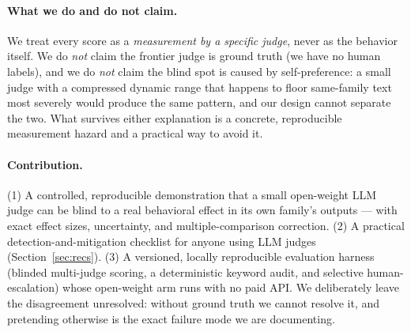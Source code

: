 \paragraph{What we do and do not claim.} We treat every score as a
\emph{measurement by a specific judge}, never as the behavior itself. We do
\emph{not} claim the frontier judge is ground truth (we have no human labels), and
we do \emph{not} claim the blind spot is caused by self-preference: a small judge
with a compressed dynamic range that happens to floor same-family text most
severely would produce the same pattern, and our design cannot separate the two.
What survives either explanation is a concrete, reproducible measurement hazard
and a practical way to avoid it.

\paragraph{Contribution.} (1) A controlled, reproducible demonstration that a
small open-weight LLM judge can be blind to a real behavioral effect in its own
family's outputs --- with exact effect sizes, uncertainty, and
multiple-comparison correction. (2) A practical detection-and-mitigation
checklist for anyone using LLM judges (Section~\ref{sec:recs}). (3) A versioned,
locally reproducible evaluation harness (blinded multi-judge scoring, a
deterministic keyword audit, and selective human-escalation) whose open-weight
arm runs with no paid API. We deliberately leave the disagreement unresolved:
without ground truth we cannot resolve it, and pretending otherwise is the exact
failure mode we are documenting.
